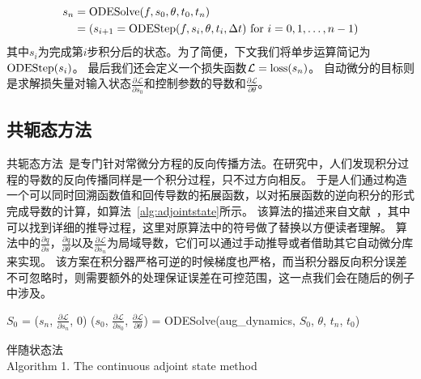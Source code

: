 \documentclass[A4,twoside,UTF8]{ctexart}
\begin{document}
\begin{align}
    \begin{split}
    s_n &= \text{ODESolve}(f, s_0, \theta, t_0, t_n)\\
        &= (s_{i+1} = {\rm ODEStep}(f, s_{i}, \theta, t_i, \Delta t) ~\text{for $i=0,1, \ldots, n-1$})
    \end{split}
\end{align}
其中$s_i$为完成第$i$步积分后的状态。为了简便，下文我们将单步运算简记为${\rm ODEStep}(s_{i})$。
最后我们还会定义一个损失函数$\mathcal{L} = {\rm loss}(s_n)$。
    自动微分的目标则是求解损失量对输入状态$\frac{\partial \mathcal{L}}{\partial s_0}$和控制参数的导数和$\frac{\partial \mathcal{L}}{\partial \theta}$。

\subsection{共轭态方法}
    共轭态方法~\cite{Plessix2006,Chen2018}是专门针对常微分方程的反向传播方法。在研究中，人们发现积分过程的导数的反向传播同样是一个积分过程，只不过方向相反。
    于是人们通过构造一个可以同时回溯函数值和回传导数的拓展函数，以对拓展函数的逆向积分的形式完成导数的计算，如算法~\ref{alg:adjointstate}所示。
该算法的描述来自文献~\cite{Chen2018}，其中可以找到详细的推导过程，这里对原算法中的符号做了替换以方便读者理解。
算法中的$\frac{\partial q}{\partial s}$，$\frac{\partial q}{\partial \theta}$以及$\frac{\partial \mathcal{L}}{\partial s_n}$为局域导数，它们可以通过手动推导或者借助其它自动微分库来实现。
该方案在积分器严格可逆的时候梯度也严格，而当积分器反向积分误差不可忽略时，则需要额外的处理保证误差在可控范围，这一点我们会在随后的例子中涉及。
\begin{algorithm}
    \SetAlgoLined
    \DontPrintSemicolon
        $S_0$ = ($s_n$, $\frac{\partial \mathcal{L}}{\partial s_n}$, $0$) 
        ($s_0$, $\frac{\partial \mathcal{L}}{\partial s_0}$, $\frac{\partial \mathcal{L}}{\partial \theta}$) = ODESolve(aug\_dynamics, $S_0$, $\theta$, $t_n$, $t_0$) 
    \caption{伴随状态法\\Algorithm 1. The continuous adjoint state method}\label{alg:adjointstate}
\end{algorithm}
\end{document}
